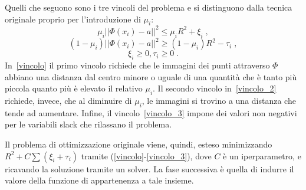 \documentclass[12pt]{report}
\theoremstyle{definition}
\begin{document}
Quelli che seguono sono i tre vincoli del problema e si distinguono dalla tecnica originale proprio per l'introduzione di $\mu_i$:
\begin{equation}\label{vincolo}
    \mu_i || \mathit{\Phi}(x_i) - a ||^2 \leq \mu_iR^2 + \xi_i \;,
\end{equation}
\begin{equation}\label{vincolo_2}
    (1 - \mu_i) || \mathit{\Phi}(x_i) - a ||^2 \geq (1 - \mu_i)R^2 - \tau_i \;,
\end{equation}
\begin{equation}\label{vincolo_3}
    \xi_i \geq 0, \tau_i \geq 0 \;.
\end{equation}
In~\ref{vincolo} il primo vincolo richiede che le immagini dei punti attraverso $\mathit{\Phi}$ abbiano una distanza dal centro minore o uguale di una quantità che è tanto più piccola quanto più è elevato il relativo $\mu_i$. Il secondo vincolo in~\ref{vincolo_2} richiede, invece, che al diminuire di $\mu_i$, le immagini si trovino a una distanza che tende ad aumentare. Infine, il vincolo~\ref{vincolo_3} impone dei valori non negativi per le variabili slack che rilassano il problema.

Il problema di ottimizzazione originale viene, quindi, esteso minimizzando $R^2 + C\sum(\xi_i + \tau_i)$ tramite (\ref{vincolo}-\ref{vincolo_3}), dove $C$ è un iperparametro, e ricavando la soluzione tramite un solver.
La fase successiva è quella di indurre il valore della funzione di appartenenza a tale insieme.
\end{document}
